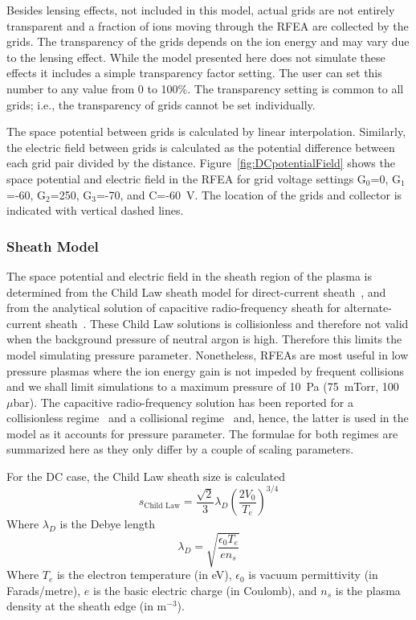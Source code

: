 Besides lensing effects, not included in this model, actual grids are not entirely transparent and a fraction of ions moving through the RFEA are collected by the grids. The transparency of the grids depends on the ion energy and may vary due to the lensing effect. While the model presented here does not simulate these effects it includes a simple transparency factor setting. The user can set this number to any value from 0 to 100\%. The transparency setting is common to all grids; i.e., the transparency of grids cannot be set individually.     

The space potential between grids is calculated by linear interpolation. Similarly, the electric field between grids is calculated as the potential difference between each grid pair divided by the distance. Figure~\ref{fig:DCpotentialField} shows the space potential and electric field in the RFEA for grid voltage settings G$_0$=0, G$_1$=-60, G$_2$=250, G$_3$=-70, and C=-60~V. The location of the grids and collector is indicated with vertical dashed lines. 


\subsubsection{\label{SheathModel}Sheath Model}
The space potential and electric field in the sheath region of the plasma is determined from the Child Law sheath model for direct-current sheath~\cite{Lieberman2005}, and from the analytical solution of capacitive radio-frequency sheath for alternate-current sheath~\cite{Lieberman1988,Lieberman1989}. These Child Law solutions is collisionless and therefore not valid when the background pressure of neutral argon is high. Therefore this limits the model simulating pressure parameter. Nonetheless, RFEAs are most useful in low pressure plasmas where the ion energy gain is not impeded by frequent collisions and we shall limit simulations to a maximum pressure of 10~Pa (75~mTorr, 100~$\mu$bar). The capacitive radio-frequency solution has been reported for a collisionless regime~\cite{Lieberman1988} and a collisional regime~\cite{Lieberman1989} and, hence, the latter is used in the model as it accounts for pressure parameter. The formulae for both regimes are summarized here as they only differ by a couple of scaling parameters. 

For the DC case, the Child Law sheath size is calculated 
\begin{equation}
s_\text{Child Law} = \frac{\sqrt{2}}{3} \lambda_D \left( \frac{2 V_0}{T_e} \right)^{3/4}
\end{equation}
Where $\lambda_D$ is the Debye length
\begin{equation}
\lambda_D = \sqrt{ \frac{\epsilon_0 T_e}{e n_s} }
\end{equation}
Where $T_e$ is the electron temperature (in eV), $\epsilon_0$ is vacuum permittivity (in Farads/metre), $e$ is the basic electric charge (in Coulomb), and $n_s$ is the plasma density at the sheath edge (in m$^{-3}$).


